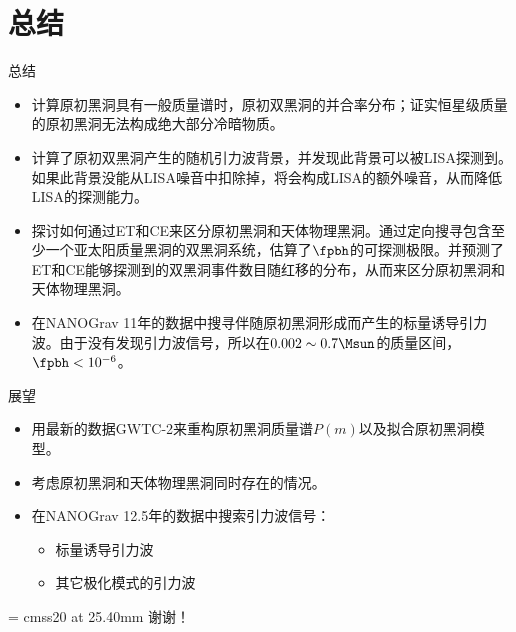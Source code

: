 \documentclass[xcolor={svgnames},compress]{beamer}
\let\olditem\item
\renewcommand{\item}{%
    \olditem\vspace{\fill}}
\begin{document}
\section{总结}
\begin{frame}{总结}
    \begin{itemize}
        \item 计算原初黑洞具有一般质量谱时，原初双黑洞的并合率分布；证实恒星级质量的原初黑洞无法构成绝大部分冷暗物质。
        
        \item 计算了原初双黑洞产生的随机引力波背景，并发现此背景可以被LISA探测到。如果此背景没能从LISA噪音中扣除掉，将会构成LISA的额外噪音，从而降低LISA的探测能力。
        
        \item 探讨如何通过ET和CE来区分原初黑洞和天体物理黑洞。通过定向搜寻包含至少一个亚太阳质量黑洞的双黑洞系统，估算了$\fpbh$的可探测极限。并预测了ET和CE能够探测到的双黑洞事件数目随红移的分布，从而来区分原初黑洞和天体物理黑洞。
        
        \item 在NANOGrav 11年的数据中搜寻伴随原初黑洞形成而产生的标量诱导引力波。由于没有发现引力波信号，所以在$0.002\sim 0.7\Msun$的质量区间，$\fpbh < 10^{-6}$。
    \end{itemize}  
\end{frame}

\begin{frame}{展望}
    \begin{itemize}
        \item 用\lvc 最新的数据GWTC-2来重构原初黑洞质量谱$P(m)$以及拟合原初黑洞模型。
        
        \item 考虑原初黑洞和天体物理黑洞同时存在的情况。
        
        \item 在NANOGrav 12.5年的数据中搜索引力波信号：
        \begin{itemize}
            \item 标量诱导引力波
            \item 其它极化模式的引力波
        \end{itemize}
    \end{itemize}  
\end{frame}

\begin{frame}[plain]
    \begin{center}
        \font\endfont = cmss20 at 25.40mm
        \color{Blue}
        \endfont
        \baselineskip 20.0mm
        \fontsize{50.0pt}{\baselineskip}\selectfont  谢谢！
    \end{center} 
\end{frame}
\end{document}

